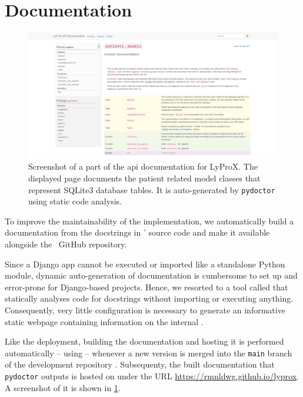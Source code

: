 \documentclass[\relativeRoot/main.tex]{subfiles}
\begin{document}
\section{Documentation}
\label{sec:lyprox:documentation}

\begin{figure}
    \centering
    \includegraphics[width=\textwidth, frame]{figures/docs.png}
    \caption[
        Documentation for LyProX
    ]{
        Screenshot of a part of the \acrshort{api} documentation for LyProX. The displayed page documents the patient related model classes that represent SQLite3 database tables. It is auto-generated by \texttt{pydoctor} \cite{hudson_pydoctor_2022} using static code analysis.
    }
    \label{fig:lyprox:documentation}
\end{figure}

To improve the maintainability of the implementation, we automatically build a documentation from the docstrings in \inlinelyproxlogo{}' source code and make it available alongside the ~GitHub repository.

Since a Django app cannot be executed or imported like a standalone Python module, dynamic auto-generation of documentation is cumbersome to set up and error-prone for Django-based projects. Hence, we resorted to a tool called  \cite{hudson_pydoctor_2022} that statically analyses code for docstrings without importing or executing anything. Consequently, very little configuration is necessary to generate an informative static webpage containing information on the internal .

Like the deployment, building the documentation and hosting it is performed automatically -- using  -- whenever a new version is merged into the \texttt{main} branch of the development repository . Subsequenty, the built documentation that \texttt{pydoctor} outputs is hosted on  under the URL \url{https://rmnldwg.github.io/lyprox}. A screenshot of it is shown in \cref{fig:lyprox:documentation}.
\end{document}
